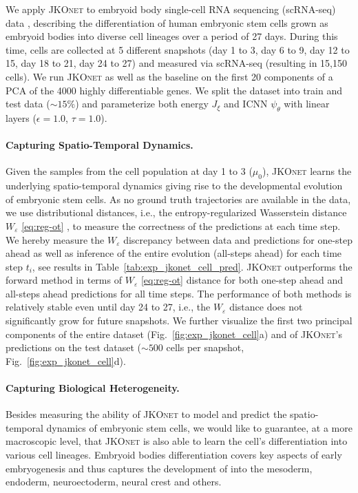 We apply \textsc{JKOnet} to embryoid body single-cell RNA sequencing (scRNA-seq) data \citep{moon2019visualizing}, describing the differentiation of human embryonic stem cells grown as embryoid bodies into diverse cell lineages over a period of 27 days. During this time, cells are collected at 5 different snapshots (day 1 to 3, day 6 to 9, day 12 to 15, day 18 to 21, day 24 to 27) and measured via scRNA-seq (resulting in 15,150 cells).
We run \textsc{JKOnet} as well as the baseline on the first 20 components of a \acrfull{PCA} of the 4000 highly differentiable genes.
We split the dataset into train and test data ($\sim 15 \%$) and parameterize both energy $J_\xi$ and ICNN $\psi_\theta$ with linear layers ($\epsilon = 1.0$, $\tau = 1.0$).

\paragraph{Capturing Spatio-Temporal Dynamics.}
Given the samples from the cell population at day 1 to 3 ($\mu_0$), \textsc{JKOnet} learns the underlying spatio-temporal dynamics giving rise to the developmental evolution of embryonic stem cells. 
As no ground truth trajectories are available in the data, we use distributional distances, i.e., the entropy-regularized Wasserstein distance $W_\varepsilon$ \eqref{eq:reg-ot} \citep{flamary2021pot}, to measure the correctness of the predictions at each time step.
We hereby measure the $W_\varepsilon$ discrepancy between data and predictions for one-step ahead as well as inference of the entire evolution (all-steps ahead) for each time step $t_i$, see results in Table~\ref{tab:exp_jkonet_cell_pred}. \textsc{JKOnet} outperforms the forward method in terms of $W_\varepsilon$ \eqref{eq:reg-ot} distance for both one-step ahead and all-steps ahead predictions for all time steps. 
The performance of both methods is relatively stable even until day 24 to 27, i.e., the $W_\varepsilon$ distance does not significantly grow for future snapshots.
We further visualize the first two principal components of the entire dataset (Fig.~\ref{fig:exp_jkonet_cell}a) and of \textsc{JKOnet}'s predictions on the test dataset ($\sim 500$ cells per snapshot, Fig.~\ref{fig:exp_jkonet_cell}d). 

\paragraph{Capturing Biological Heterogeneity.}
Besides measuring the ability of \textsc{JKOnet} to model and predict the spatio-temporal dynamics of embryonic stem cells, we would like to guarantee, at a more macroscopic level, that \textsc{JKOnet} is also able to learn the cell's differentiation into various cell lineages.
Embryoid bodies differentiation covers key aspects of early embryogenesis and thus captures the development of  into the mesoderm, endoderm, neuroectoderm, neural crest and others.

